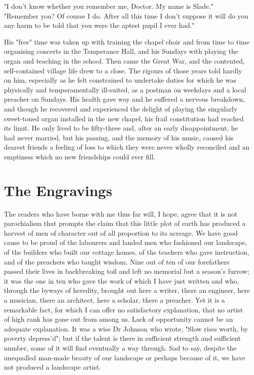 "I don't know whether you remember me, Doctor. My name is Slade."
"Remember you? Of course I do. After all this time I don't suppose it  will do you any harm to be told that you were the aptest pupil I ever had."

His "free" time	was taken up with training the chapel choir and from time to time organising concerts in the Temperance Hall, and his Sundays with playing	the organ and teaching in the school. Then came the Great War, and the contented, self-contained village life drew to a close. The rigours of those years told hardly on him, especially as he felt constrained to undertake duties for which he was physically and temperamentally ill-suited, as a postman on weekdays and a local preacher on Sundays. His health gave way and he suffered a nervous breakdown, and though he recovered and experienced the delight of playing the singularly sweet-toned organ installed in the new chapel, his frail constitution had reached its limit. He only lived to be fifty-three and, after an early disappointment, he had never married, but his passing, and the memory of his music, caused his dearest friends a feeling of loss to which they were never wholly reconciled and an emptiness which no new friendships could ever fill.
 
\section{The Engravings}

The readers who have borne with me thus far will, I hope, agree that it is not parochialism that prompts the claim that this little plot of earth has produced a harvest of men of character out of all proportion to its acreage. We have good cause to be proud of the labourers and landed men who fashioned our landscape, of the builders who built our cottage homes, of the teachers who gave instruction, and of the preachers who taught wisdom. Nine out of ten of our forefathers passed their lives in backbreaking toil and left no memorial but a season's furrow; it was the one in ten who gave the work of which I have just written and who, through the byways of heredity, brought out here a writer, there an engineer, here a musician, there an architect, here a scholar, there a preacher. Yet it is a remarkable fact, for which I can offer no satisfactory explanation, that no artist of high rank has gone out from among us. Lack of opportunity cannot be an adequate explanation. It was a wise Dr Johnson who wrote, "Slow rises worth, by poverty depress'd"; but if the talent is there in sufficient strength and sufficient number, some of it will find eventually a way through. Sad to say, despite the unequalled man-made beauty of our landscape or perhaps because of it, we have not produced a landscape artist.

